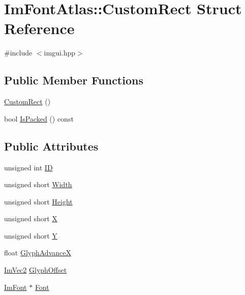 \hypertarget{struct_im_font_atlas_1_1_custom_rect}{}\section{Im\+Font\+Atlas\+:\+:Custom\+Rect Struct Reference}
\label{struct_im_font_atlas_1_1_custom_rect}


{\ttfamily \#include $<$imgui.\+hpp$>$}

\subsection*{Public Member Functions}
\begin{DoxyCompactItemize}
\item 
\hyperlink{struct_im_font_atlas_1_1_custom_rect_abee2845214da5ffc9c77bb388402a0a9}{Custom\+Rect} ()
\item 
bool \hyperlink{struct_im_font_atlas_1_1_custom_rect_ac15602342c8eabbddf559bc84a3e6700}{Is\+Packed} () const
\end{DoxyCompactItemize}
\subsection*{Public Attributes}
\begin{DoxyCompactItemize}
\item 
unsigned int \hyperlink{struct_im_font_atlas_1_1_custom_rect_a1afc9c6d72105e6695fbefa08e086387}{ID}
\item 
unsigned short \hyperlink{struct_im_font_atlas_1_1_custom_rect_a961e02b6cda1eb69dfd2f2d40ae40d5f}{Width}
\item 
unsigned short \hyperlink{struct_im_font_atlas_1_1_custom_rect_a7b423a44d98a6f5695941300906418e5}{Height}
\item 
unsigned short \hyperlink{struct_im_font_atlas_1_1_custom_rect_af080bc8663332dfd5576d9a6a5313089}{X}
\item 
unsigned short \hyperlink{struct_im_font_atlas_1_1_custom_rect_ae1739c480b82fa11ebdd1edb9e3cf5eb}{Y}
\item 
float \hyperlink{struct_im_font_atlas_1_1_custom_rect_afb55b310d9816386f2eb2f11df9f11e2}{Glyph\+AdvanceX}
\item 
\hyperlink{struct_im_vec2}{Im\+Vec2} \hyperlink{struct_im_font_atlas_1_1_custom_rect_a18a84c649c382fafe75eba628b5d599e}{Glyph\+Offset}
\item 
\hyperlink{struct_im_font}{Im\+Font} $\ast$ \hyperlink{struct_im_font_atlas_1_1_custom_rect_aeffa65b37c8d9241e3720472a019aad2}{Font}
\end{DoxyCompactItemize}


